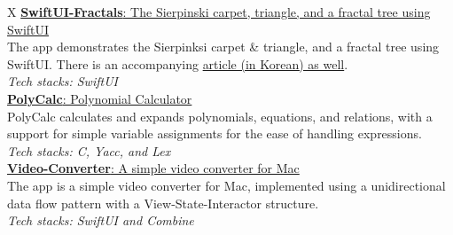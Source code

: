 \documentclass[a4paper,10pt]{memoir}
\begin{document}
\begin{tblr}{X}
  \href{https://github.com/Zeta611/SwiftUI-Fractals}{\textbf{SwiftUI-Fractals}: The Sierpinski carpet, triangle, and a fractal tree using SwiftUI}                                                                                                                                             \\
  The app demonstrates the Sierpinksi carpet \& triangle, and a fractal tree using SwiftUI. There is an accompanying \href{https://zetablog.io/posts/fractals-in-swiftui}{article (in Korean) as well}.                                                                                        \\
  \textit{Tech stacks: SwiftUI}                                                                                                                                                                                                                                                                \\[0.5\onelineskip]

  \href{https://github.com/Zeta611/polycalc}{\textbf{PolyCalc}: Polynomial Calculator}                                                                                                                                                                                                         \\
  PolyCalc calculates and expands polynomials, equations, and relations, with a support for simple variable assignments for the ease of handling expressions.                                                                                                                                  \\
  \textit{Tech stacks: C, Yacc, and Lex}                                                                                                                                                                                                                                                       \\[0.5\onelineskip]

  \href{https://github.com/Zeta611/Video-Converter}{\textbf{Video-Converter}: A simple video converter for Mac}                                                                                                                                                                                \\
  The app is a simple video converter for Mac, implemented using a unidirectional data flow pattern with a View-State-Interactor structure.                                                                                                                                                    \\
  \textit{Tech stacks: SwiftUI and Combine}                                                                                                                                                                                                                                                    \\[0.5\onelineskip]


\end{tblr}
\end{document}
